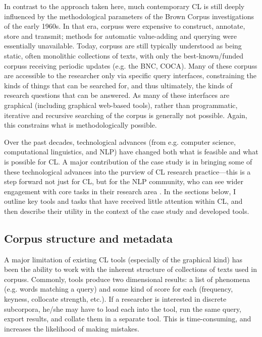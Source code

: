 
In contrast to the approach taken here, much contemporary \gls{CL} is still deeply influenced by the methodological parameters of the Brown Corpus investigations of the early 1960s. In that era, \glspl{corpus} were expensive to construct, annotate, store and transmit; methods for automatic value\hyp{}adding and querying were essentially unavailable. Today, \glspl{corpus} are still typically understood as being static, often monolithic collections of texts, with only the best\hyp{}known\slash funded \glspl{corpus} receiving periodic updates (e.g. the BNC, COCA). Many of these \glspl{corpus} are accessible to the researcher only via specific query interfaces, constraining the kinds of things that can be searched for, and thus ultimately, the kinds of research questions that can be answered. As many of these interfaces are graphical (including graphical web\hyp{}based tools), rather than programmatic, iterative and recursive searching of the \gls{corpus} is generally not possible. Again, this constrains what is methodologically possible.

Over the past decades, technological advances (from e.g. computer science, computational linguistics, and \gls{NLP}) have changed both what is feasible and what is possible for \gls{CL}. A major contribution of the case study is in bringing some of these technological advances into the purview of \gls{CL} research practice---this is a step forward not just for \gls{CL}, but for the \gls{NLP} community, who can see wider engagement with core tasks in their research area \cite{de2008stanford}. In the sections below, I outline key tools and tasks that have received little attention within \gls{CL}, and then describe their utility in the context of the case study and developed tools.


\subsection{Corpus structure and metadata}

A major limitation of existing \gls{CL} tools (especially of the graphical kind) has been the ability to work with the inherent structure of collections of texts used in \glspl{corpus}. Commonly, tools produce two dimensional results: a list of phenomena (e.g. words matching a query) and some kind of score for each (frequency, keyness, collocate strength, etc.). If a researcher is interested in discrete subcorpora, he\slash she may have to load each into the tool, run the same query, export results, and collate them in a separate tool. This is time-consuming, and increases the likelihood of making mistakes.

